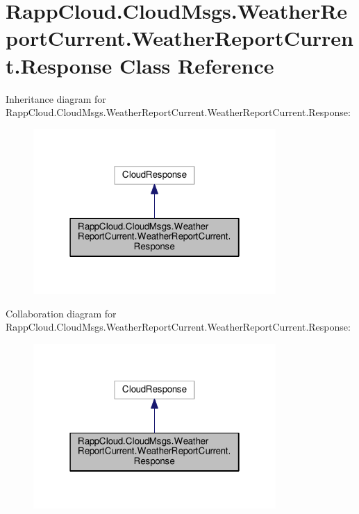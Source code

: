 \hypertarget{classRappCloud_1_1CloudMsgs_1_1WeatherReportCurrent_1_1WeatherReportCurrent_1_1Response}{\section{Rapp\-Cloud.\-Cloud\-Msgs.\-Weather\-Report\-Current.\-Weather\-Report\-Current.\-Response Class Reference}
\label{classRappCloud_1_1CloudMsgs_1_1WeatherReportCurrent_1_1WeatherReportCurrent_1_1Response}
}


Inheritance diagram for Rapp\-Cloud.\-Cloud\-Msgs.\-Weather\-Report\-Current.\-Weather\-Report\-Current.\-Response\-:
\nopagebreak
\begin{figure}[H]
\begin{center}
\leavevmode
\includegraphics[width=262pt]{classRappCloud_1_1CloudMsgs_1_1WeatherReportCurrent_1_1WeatherReportCurrent_1_1Response__inherit__graph}
\end{center}
\end{figure}


Collaboration diagram for Rapp\-Cloud.\-Cloud\-Msgs.\-Weather\-Report\-Current.\-Weather\-Report\-Current.\-Response\-:
\nopagebreak
\begin{figure}[H]
\begin{center}
\leavevmode
\includegraphics[width=262pt]{classRappCloud_1_1CloudMsgs_1_1WeatherReportCurrent_1_1WeatherReportCurrent_1_1Response__coll__graph}
\end{center}
\end{figure}
